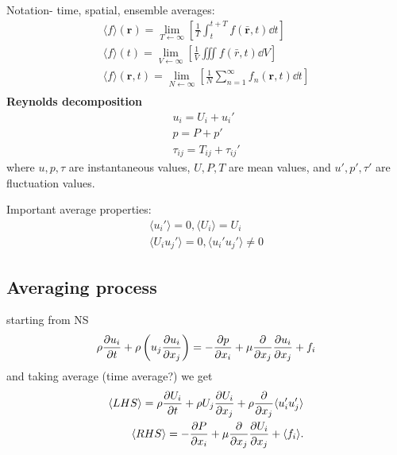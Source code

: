 \documentclass{article}
\let\vec\mathbf
\begin{document}
Notation- time, spatial, ensemble averages:
\begin{equation}
	\begin{split}
	\langle f\rangle(\vec r) = \lim_{T\leftarrow\infty}\left[\frac{1}{T}\int_{t}^{t+T}f(\bar{ \vec r},t )\dd{t}   \right]\\
	\langle f\rangle(t) = \lim_{V\leftarrow\infty}\left[\frac{1}{V}\iiint f(\bar{r},t )\dd{V}   \right]\\
	\langle f\rangle(\vec r,t) = \lim_{N\leftarrow\infty}\left[\frac{1}{N}\sum_{n=1}^{\infty}f_{n}({ \vec r},t )\dd{t}   \right]\\
	\end{split}
\end{equation}
\textbf{Reynolds decomposition}
\begin{equation}
	\begin{split}
	u_{i} = U_{i}+ u_{i}'\\
	p = P + p'\\
	\tau_{ij} = T_{ij} + \tau_{ij}'
	\end{split}
\end{equation}
where $u,p,\tau$ are instantaneous values, $U,P,T$ are mean values, and $u',p',\tau'$ are fluctuation values. 

Important average properties: 
\begin{equation}
	\begin{split}
	\langle u_{i}'\rangle= 0,\langle U_{i}\rangle = U_{i}\\
	\langle U_{i}u_{j}'\rangle=0, \langle u_{i}'u_{j}'\rangle\neq 0
	\end{split}
\end{equation}


\subsection{Averaging process}
starting from NS
\begin{equation}
	\rho \pdv{u_{i}}{t} + \rho\left(u_{j}\pdv {u_{i}}{x_{j}}\right) = -\pdv{p}{x_{i}}+ \mu \pdv{x_{j}}\pdv{u_{i}}{x_{j}} + f_{i}
\end{equation}
and taking average (time average?) we get 
\begin{equation}
	\begin{split}
	\langle LHS\rangle = \rho\pdv{U_{i}}{t} + \rho U_{j}\pdv{U_{i}}{x_{j}} + \rho \pdv {x_{j}}\langle u_{i}'u_{j}'\rangle\\
	\langle RHS\rangle = -\pdv{P}{x_{i}} + \mu \pdv{x_{j}}\pdv{U_{i}}{x_{j}} + \langle f_{i}\rangle.
	\end{split}
\end{equation}
\end{document}
